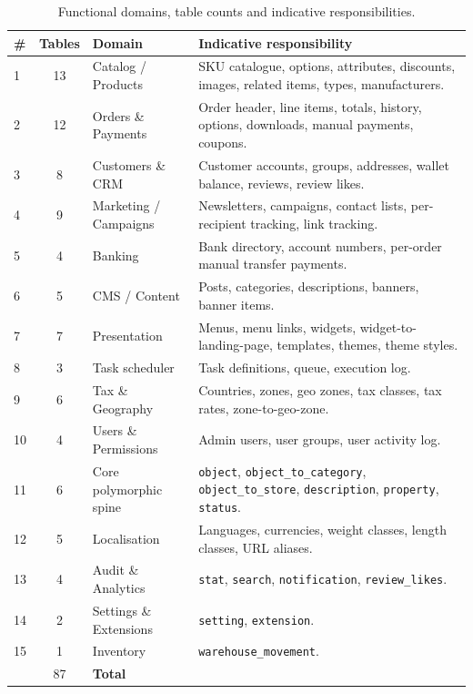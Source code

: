 \documentclass[11pt,a4paper]{article}
\begin{document}
\begin{table}[htbp]
\centering
\caption{Functional domains, table counts and indicative responsibilities.}\label{tab:domains}
\small
\begin{tabularx}{\columnwidth}{lclX}
\toprule
\textbf{\#} & \textbf{Tables} & \textbf{Domain} & \textbf{Indicative responsibility} \\
\midrule
1  & 13 & Catalog / Products    & SKU catalogue, options, attributes, discounts, images, related items, types, manufacturers. \\
2  & 12 & Orders \& Payments    & Order header, line items, totals, history, options, downloads, manual payments, coupons. \\
3  & 8  & Customers \& CRM      & Customer accounts, groups, addresses, wallet balance, reviews, review likes. \\
4  & 9  & Marketing / Campaigns & Newsletters, campaigns, contact lists, per-recipient tracking, link tracking. \\
5  & 4  & Banking               & Bank directory, account numbers, per-order manual transfer payments. \\
6  & 5  & CMS / Content         & Posts, categories, descriptions, banners, banner items. \\
7  & 7  & Presentation          & Menus, menu links, widgets, widget-to-landing-page, templates, themes, theme styles. \\
8  & 3  & Task scheduler        & Task definitions, queue, execution log. \\
9  & 6  & Tax \& Geography      & Countries, zones, geo zones, tax classes, tax rates, zone-to-geo-zone. \\
10 & 4  & Users \& Permissions  & Admin users, user groups, user activity log. \\
11 & 6  & Core polymorphic spine & \texttt{object}, \texttt{object\_to\_category}, \texttt{object\_to\_store}, \texttt{description}, \texttt{property}, \texttt{status}. \\
12 & 5  & Localisation          & Languages, currencies, weight classes, length classes, URL aliases. \\
13 & 4  & Audit \& Analytics    & \texttt{stat}, \texttt{search}, \texttt{notification}, \texttt{review\_likes}. \\
14 & 2  & Settings \& Extensions & \texttt{setting}, \texttt{extension}. \\
15 & 1  & Inventory             & \texttt{warehouse\_movement}. \\
\midrule
   & 87 & \textbf{Total}        & \\
\bottomrule
\end{tabularx}
\end{table}
\end{document}
